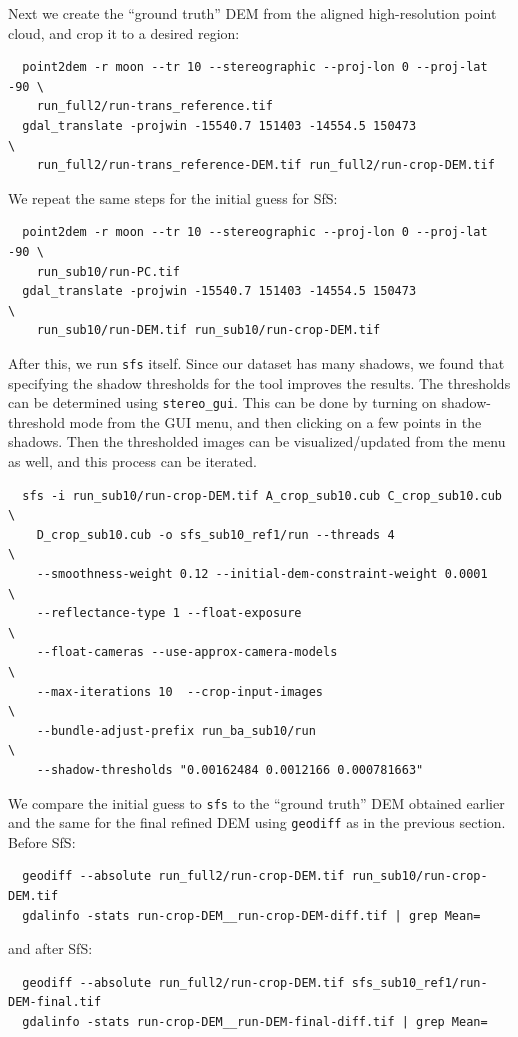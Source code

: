 Next we create the ``ground truth'' DEM from the aligned high-resolution
point cloud, and crop it to a desired region:
\begin{verbatim}
  point2dem -r moon --tr 10 --stereographic --proj-lon 0 --proj-lat -90 \
    run_full2/run-trans_reference.tif
  gdal_translate -projwin -15540.7 151403 -14554.5 150473               \
    run_full2/run-trans_reference-DEM.tif run_full2/run-crop-DEM.tif
\end{verbatim}
We repeat the same steps for the initial guess for SfS:
\begin{verbatim}
  point2dem -r moon --tr 10 --stereographic --proj-lon 0 --proj-lat -90 \
    run_sub10/run-PC.tif
  gdal_translate -projwin -15540.7 151403 -14554.5 150473               \
    run_sub10/run-DEM.tif run_sub10/run-crop-DEM.tif
\end{verbatim}
After this, we run \texttt{sfs} itself. Since our dataset has many shadows, we found
that specifying the shadow thresholds for the tool improves the
results. The thresholds can be determined using \texttt{stereo\_gui}.
This can be done by turning on shadow-threshold mode from the GUI menu, 
and then clicking on a few points in the shadows.  Then the thresholded images
can be visualized/updated from the menu as well, and this process can be iterated.
\begin{verbatim}
  sfs -i run_sub10/run-crop-DEM.tif A_crop_sub10.cub C_crop_sub10.cub \
    D_crop_sub10.cub -o sfs_sub10_ref1/run --threads 4                \
    --smoothness-weight 0.12 --initial-dem-constraint-weight 0.0001   \
    --reflectance-type 1 --float-exposure                             \
    --float-cameras --use-approx-camera-models                        \
    --max-iterations 10  --crop-input-images                          \
    --bundle-adjust-prefix run_ba_sub10/run                           \
    --shadow-thresholds "0.00162484 0.0012166 0.000781663"
\end{verbatim}
We compare the initial guess to \texttt{sfs} to the ``ground truth'' DEM
obtained earlier and the same for the final refined DEM using
\texttt{geodiff} as in the previous section. Before SfS:

\begin{verbatim}
  geodiff --absolute run_full2/run-crop-DEM.tif run_sub10/run-crop-DEM.tif
  gdalinfo -stats run-crop-DEM__run-crop-DEM-diff.tif | grep Mean=  
\end{verbatim}
and after SfS:
\begin{verbatim}
  geodiff --absolute run_full2/run-crop-DEM.tif sfs_sub10_ref1/run-DEM-final.tif
  gdalinfo -stats run-crop-DEM__run-DEM-final-diff.tif | grep Mean=
\end{verbatim}

